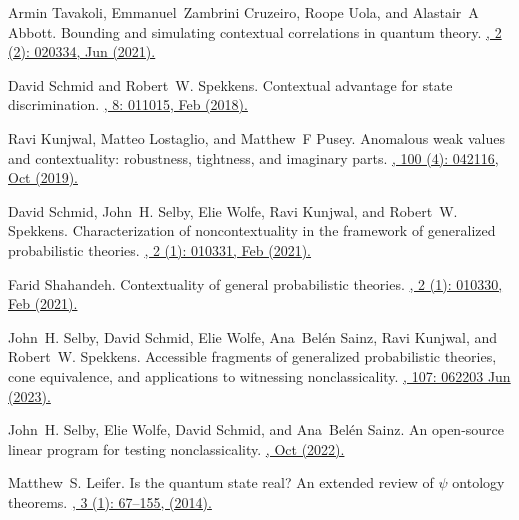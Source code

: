 \documentclass[letterpaper,onecolumn,12pt,accepted=2024-01-17]{article}
\begin{document}
\begin{thebibliography}{100}
Armin Tavakoli, Emmanuel~Zambrini Cruzeiro, Roope Uola, and Alastair~A Abbott.
\newblock Bounding and simulating contextual correlations in quantum theory.
\href{https://doi.org/10.1103/PRXQuantum.2.020334}{, 2 (2): 020334, Jun (2021).}

David Schmid and Robert~W. Spekkens.
\newblock Contextual advantage for state discrimination.
\href{https://doi.org/10.1103/PhysRevX.8.011015}{, 8: 011015, Feb (2018).}

Ravi Kunjwal, Matteo Lostaglio, and Matthew~F Pusey.
\newblock Anomalous weak values and contextuality: robustness, tightness, and
  imaginary parts.
\href{https://doi.org/10.1103/PhysRevA.100.042116}{, 100 (4): 042116, Oct (2019).}

David Schmid, John~H. Selby, Elie Wolfe, Ravi Kunjwal, and Robert~W. Spekkens.
\newblock Characterization of noncontextuality in the framework of generalized probabilistic theories.
\href{https://doi.org/10.1103/PRXQuantum.2.010331}{, 2 (1): 010331, Feb (2021).}

Farid Shahandeh.
\newblock Contextuality of general probabilistic theories.
\href{https://journals.aps.org/prxquantum/abstract/10.1103/PRXQuantum.2.010330}{, 2 (1): 010330, Feb (2021).}

John~H. Selby, David Schmid, Elie Wolfe, Ana~Bel{\'e}n Sainz, Ravi Kunjwal, and
  Robert~W. Spekkens.
\newblock Accessible fragments of generalized probabilistic theories, cone
  equivalence, and applications to witnessing nonclassicality.
\href{https://doi.org/10.1103/PhysRevA.107.062203}{, 107: 062203 Jun (2023).}

John~H. Selby, Elie Wolfe, David Schmid, and Ana~Bel{\'e}n Sainz.
\newblock An open-source linear program for testing nonclassicality.
\href{https://doi.org/10.48550/arXiv.2204.11905}{, Oct (2022).}

Matthew~S. Leifer.
\newblock Is the quantum state real? {A}n extended review of $\psi$ ontology theorems.
\href{https://doi.org/10.12743/quanta.v3i1.22}{, 3 (1): 67--155, (2014).}


\end{thebibliography}
\end{document}
